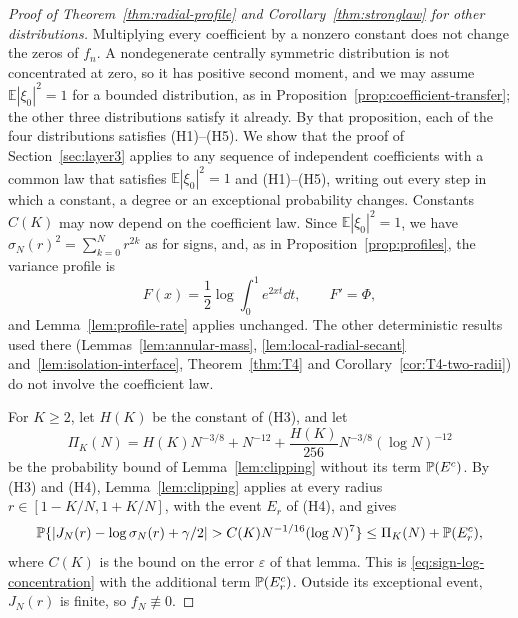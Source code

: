 \begin{proof}[Proof of Theorem~\ref{thm:radial-profile} and Corollary~\ref{thm:stronglaw} for other distributions]
Multiplying every coefficient by a nonzero constant does not change the
zeros of $f_n$. A nondegenerate centrally symmetric distribution is not
concentrated at zero, so it has positive second moment, and we may assume
$\mathbb E|\xi_0|^2=1$ for a bounded distribution, as in
Proposition~\ref{prop:coefficient-transfer}; the other three
distributions satisfy it already.
By that proposition, each of the four distributions satisfies (H1)--(H5).
We show that the proof of Section~\ref{sec:layer3} applies to any
sequence of independent coefficients with a common law that satisfies
$\mathbb E|\xi_0|^2=1$ and (H1)--(H5), writing out every step in which a
constant, a degree or an exceptional probability changes.
Constants $C(K)$ may now depend on the coefficient law.
Since $\mathbb E|\xi_0|^2=1$, we have
$\sigma_N(r)^2=\sum_{k=0}^Nr^{2k}$ as for signs, and, as in
Proposition~\ref{prop:profiles}, the variance profile is
\[
 F(x)=\frac12\log\int_0^1e^{2xt}\dd t,\qquad F'=\Phi,
\]
and Lemma~\ref{lem:profile-rate} applies unchanged. The other
deterministic results used there (Lemmas~\ref{lem:annular-mass},
\ref{lem:local-radial-secant} and~\ref{lem:isolation-interface},
Theorem~\ref{thm:T4} and Corollary~\ref{cor:T4-two-radii}) do not involve
the coefficient law.

For $K\ge2$, let $H(K)$ be the constant of (H3), and let
\[
 \Pi_K(N)=H(K)N^{-3/8}+N^{-12}+\frac{H(K)}{256}N^{-3/8}(\log N)^{-12}
\]
be the probability bound of Lemma~\ref{lem:clipping} without its term
$\mathbb P(E^c)$. By (H3) and (H4), Lemma~\ref{lem:clipping} applies at every
radius $r\in[1-K/N,1+K/N]$, with the event $E_r$ of (H4), and gives
\begin{equation}
 \Prob\{|J_N(r)-\log\sigma_N(r)+\gamma/2|>C(K)N^{-1/16}(\log N)^7\}
 \le\Pi_K(N)+\Prob(E_r^c),
 \label{eq:model-log-concentration}
\end{equation}
where $C(K)$ is the bound on the error $\varepsilon$ of that lemma.
This is \eqref{eq:sign-log-concentration} with the additional term
$\mathbb P(E_r^c)$. Outside its exceptional event, $J_N(r)$ is finite, so
$f_N\not\equiv0$.


\end{proof}
